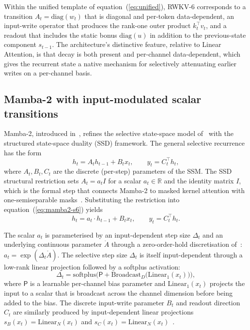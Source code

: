 Within the unified template of equation~(\ref{eq:unified}), RWKV-6
corresponds to a transition $A_{t} = \mathrm{diag}(w_{t})$ that is
diagonal and per-token data-dependent, an input-write operator that
produces the rank-one outer product $k_{t}^{\top} v_{t}$, and a
readout that includes the static bonus $\mathrm{diag}(u)$ in addition
to the previous-state component $s_{t-1}$. The architecture's
distinctive feature, relative to Linear Attention, is that decay is
both present and per-channel data-dependent, which gives the recurrent
state a native mechanism for selectively attenuating earlier writes
on a per-channel basis.

\subsection{Mamba-2 with input-modulated scalar transitions}\label{sec:backbones:mamba2}

Mamba-2, introduced in~\citet{dao2024transformers}, refines the
selective state-space model of~\citet{gu2023mamba} with the
structured state-space duality (SSD) framework. The general
selective recurrence has the form
\begin{equation}\label{eq:mamba2-s6}
h_{t} = A_{t} h_{t-1} + B_{t} x_{t}, \qquad y_{t} = C_{t}^{\top} h_{t},
\end{equation}
where $A_{t}, B_{t}, C_{t}$ are the discrete (per-step) parameters of
the SSM. The SSD structural restriction sets $A_{t} = a_{t} I$ for a
scalar $a_{t} \in \mathbb{R}$ and the identity matrix $I$, which is
the formal step that connects Mamba-2 to masked kernel attention with
one-semiseparable masks~\cite[Section~3]{dao2024transformers}.
Substituting the restriction into equation~(\ref{eq:mamba2-s6}) yields
\begin{equation}\label{eq:mamba2-ssd}
h_{t} = a_{t} \cdot h_{t-1} + B_{t} x_{t}, \qquad y_{t} = C_{t}^{\top} h_{t}.
\end{equation}

The scalar $a_{t}$ is parameterised by an input-dependent step size
$\Delta_{t}$ and an underlying continuous parameter $\mathring{A}$
through a zero-order-hold discretisation
of~\citet[eq.~zoh]{gu2023mamba}: $a_{t} = \exp(\Delta_{t} \mathring{A})$.
The selective step size $\Delta_{t}$ is itself input-dependent through
a low-rank linear projection followed by a softplus activation:
\begin{equation}\label{eq:mamba2-delta}
\Delta_{t} = \mathrm{softplus}\!\Big(\mathsf{P} + \mathrm{Broadcast}_{D}\!\big(\mathrm{Linear}_{1}(x_{t})\big)\Big),
\end{equation}
where $\mathsf{P}$ is a learnable per-channel bias parameter and
$\mathrm{Linear}_{1}(x_{t})$ projects the input to a scalar that is
broadcast across the channel dimension before being added to the bias.
The discrete input-write parameter $B_{t}$ and readout direction
$C_{t}$ are similarly produced by input-dependent linear projections
$s_{B}(x_{t}) = \mathrm{Linear}_{N}(x_{t})$ and $s_{C}(x_{t}) = \mathrm{Linear}_{N}(x_{t})$~\cite{gu2023mamba}.

